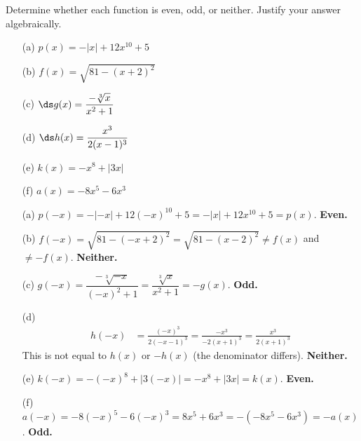 \documentclass{ximera}
\begin{document}
\begin{problem}
Determine whether each function is even, odd, or neither. Justify your answer algebraically.
\begin{enumerate}
  \item[(a)] $p(x) = -|x| + 12x^{10} + 5$
  \medskip
  \item[(b)] $f(x) = \sqrt{81 - (x+2)^2}$
  \medskip
  \item[(c)] $\ds g(x) = \dfrac{-\sqrt[3]{x}}{x^2+1}$
  \medskip
  \item[(d)] $\ds h(x) = \dfrac{x^3}{2(x-1)^3}$
  \medskip
  \item[(e)] $k(x) = -x^8 + |3x|$
  \medskip
  \item[(f)] $a(x) = -8x^5 - 6x^3$
\end{enumerate}

\begin{solution}
\begin{enumerate}
  \item[(a)] $p(-x) = -|-x|+12(-x)^{10}+5 = -|x|+12x^{10}+5 = p(x)$. \textbf{Even.}

  \item[(b)] $f(-x) = \sqrt{81-(-x+2)^2} = \sqrt{81-(x-2)^2} \neq f(x)$ and $\neq -f(x)$. \textbf{Neither.}

  \item[(c)] $g(-x) = \dfrac{-\sqrt[3]{-x}}{(-x)^2+1} = \dfrac{\sqrt[3]{x}}{x^2+1} = -g(x)$. \textbf{Odd.}

  \item[(d)]
  \begin{align*}
    h(-x) &= \frac{(-x)^3}{2(-x-1)^3} = \frac{-x^3}{-2(x+1)^3} = \frac{x^3}{2(x+1)^3}
  \end{align*}
  This is not equal to $h(x)$ or $-h(x)$ (the denominator differs). \textbf{Neither.}

  \item[(e)] $k(-x) = -(-x)^8+|3(-x)| = -x^8+|3x| = k(x)$. \textbf{Even.}

  \item[(f)] $a(-x) = -8(-x)^5-6(-x)^3 = 8x^5+6x^3 = -(- 8x^5-6x^3) = -a(x)$. \textbf{Odd.}
\end{enumerate}
\end{solution}
\end{problem}
\end{document}
